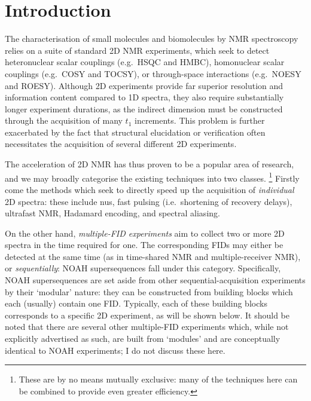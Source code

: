 \section{Introduction}
\label{sec:noah__introduction}

The characterisation of small molecules and biomolecules by NMR spectroscopy relies on a suite of standard 2D NMR experiments, which seek to detect heteronuclear scalar couplings (e.g.\ HSQC and HMBC), homonuclear scalar couplings (e.g.\ COSY and TOCSY), or through-space interactions (e.g.\ NOESY and ROESY).
Although 2D experiments provide far superior resolution and information content compared to 1D spectra, they also require substantially longer experiment durations, as the indirect dimension must be constructed through the acquisition of many $t_1$ increments.
This problem is further exacerbated by the fact that structural elucidation or verification often necessitates the acquisition of several different 2D experiments.

The acceleration of 2D NMR has thus proven to be a popular area of research, and we may broadly categorise the existing techniques into two classes.%
\footnote{These are by no means mutually exclusive: many of the techniques here can be combined to provide even greater efficiency.}
Firstly come the methods which seek to directly speed up the acquisition of \textit{individual} 2D spectra: these include
\acf{nus}\autocite{Barna1987JMR,Kazimierczuk2010PNMRS,Mobli2014PNMRS,Kazimierczuk2015MRC},
fast pulsing (i.e.\ shortening of recovery delays)\autocite{SchulzeSunninghausen2014JACS,Schanda2006JACS,Kupce2007MRC,Schanda2009PNMRS},
ultrafast NMR\autocite{Frydman2002PNASUSA,Pelupessy2003JACS,Frydman2003JACS,Tal2010PNMRS,Gouilleux2018ARNMRS,Kupce2021NRMP},
Hadamard encoding\autocite{Kupce2003JMR,Kupce2003PNMRS},
and spectral aliasing\autocite{Jeannerat2000MRC,Bermel2009JACS,Njock2010C,Jeannerat2011eMR}.

On the other hand, \textit{multiple-FID experiments} aim to collect two or more 2D spectra in the time required for one.
The corresponding FIDs may either be detected at the same time (as in
time-shared NMR\autocite{Nolis2007ACIE,Parella2010CMR,Nolis2019JMR_psHSQC} and
multiple-receiver NMR\autocite{Kupce2006JACS,Kupce2008JACS,Kovacs2016MRC}),
or \textit{sequentially}: NOAH supersequences\autocite{Kupce2017ACIE,Kupce2021PNMRS,Kupce2021NRMP} fall under this category.
Specifically, NOAH supersequences are set aside from other sequential-acquisition experiments\autocite{Haasnoot1984JMR,Gurevich1984JMR,MotiramCorral2018CC,Nolis2019MRC,Nolis2019CPC,Nolis2019JMR} by their `modular' nature: they can be constructed from building blocks which each (usually) contain one FID.
Typically, each of these building blocks corresponds to a specific 2D experiment, as will be shown below.
It should be noted that there are several other multiple-FID experiments which, while not explicitly advertised as such, are built from `modules' and are conceptually identical to NOAH experiments\autocite{Nagy2019CC,Nagy2020JMR,Nagy2021ACIE,Timari2022CC}; I do not discuss these here.


